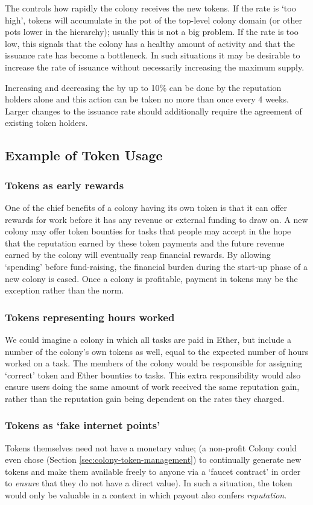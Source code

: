 The  controls how rapidly the colony receives the new tokens. If the rate is `too high', tokens will accumulate in the pot of the top-level colony domain (or other pots lower in the hierarchy); usually this is not a big problem. If the rate is too low, this signals that the colony has a healthy amount of activity and that the issuance rate has become a bottleneck. In such situations it may be desirable to increase the rate of issuance without necessarily increasing the maximum supply.

Increasing and decreasing the  by up to 10\% can be done by the reputation holders alone and this action can be taken no more than once every 4 weeks. Larger changes to the issuance rate should additionally require the agreement of existing token holders.


\subsection{Example of Token Usage}\label{sec:colony-token-examples}
\subsubsection*{Tokens as early rewards}
One of the chief benefits of a colony having its own token is that it can offer rewards for work before it has any revenue or external funding to draw on.
A new colony may offer token bounties for tasks that people may accept in the hope that the reputation earned by these token payments and the future revenue earned by the colony will eventually reap financial rewards. By allowing `spending' before fund-raising, the financial burden during the start-up phase of a new colony is eased. Once a colony is profitable, payment in tokens may be the exception rather than the norm.

\subsubsection*{Tokens representing hours worked}
We could imagine a colony in which all tasks are paid in Ether, but include a number of the colony's own tokens as well, equal to the expected number of hours worked on a task. The members of the colony would be responsible for assigning `correct' token and Ether bounties to tasks. This extra responsibility would also ensure users doing the same amount of work received the same reputation gain, rather than the reputation gain being dependent on the rates they charged.

\subsubsection*{Tokens as `fake internet points'}
Tokens themselves need not have a monetary value; (a non-profit Colony could even chose (Section \ref{sec:colony-token-management}) to continually generate new tokens and make them available freely to anyone via a `faucet contract' in order to \emph{ensure} that they do not have a direct value). In such a situation, the token would only be valuable in a context in which payout also confers \emph{reputation}.